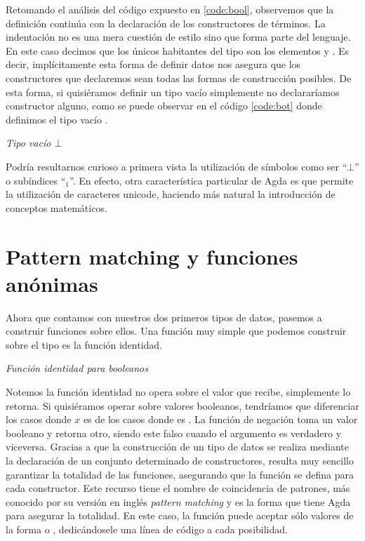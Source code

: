 Retomando el análisis del código expuesto en \ref{code:bool}, observemos que la definición continúa con la declaración de los constructores de términos. La indentación no es una mera cuestión de estilo sino que forma parte del lenguaje. En este caso decimos que los únicos habitantes del tipo  son los elementos  y . Es decir, implícitamente esta forma de definir datos nos asegura que los constructores que declaremos sean todas las formas de construcción posibles.
De esta forma, si quisiéramos definir un tipo vacío simplemente no declararíamos constructor alguno, como se puede observar en el código \ref{code:bot} donde definimos el tipo vacío \AgdaDatatype{$\bot$}.

\begin{agdacode}{\it Tipo vacío $\bot$}\label{code:bot}
  
\end{agdacode}

Podría resultarnos curioso a primera vista la utilización de símbolos como ser ``$\bot$'' o subíndices ``$_{1}$''. En efecto, otra característica particular de Agda es que permite la utilización de caracteres unicode, haciendo más natural la introducción de conceptos matemáticos.

\section{Pattern matching y funciones anónimas} \label{agda:function}

Ahora que contamos con nuestros dos primeros tipos de datos, pasemos a construir funciones sobre ellos.
Una función muy simple que podemos construir sobre el tipo  es la función identidad.

\begin{agdacode}{\it Función identidad para booleanos}\label{code:idBool}

\end{agdacode}
Notemos la función identidad no opera sobre el valor que recibe, simplemente lo retorna. Si quisiéramos operar sobre valores booleanos, tendríamos que diferenciar los casos donde $x$ es  de los casos donde es .
La función  de negación toma un valor booleano y retorna otro, siendo este falso cuando el argumento es verdadero y viceversa.
Gracias a que la construcción de un tipo de datos se realiza mediante la declaración de un conjunto determinado de constructores,
resulta muy sencillo garantizar la totalidad de las funciones, asegurando que la función se defina para cada constructor. Este recurso tiene el nombre de coincidencia de patrones, más conocido por su versión en inglés {\it pattern matching} y es la forma que tiene Agda para asegurar la totalidad. En este caso, la función  puede aceptar sólo valores de la forma  o , dedicándosele una línea de código a cada posibilidad. 


